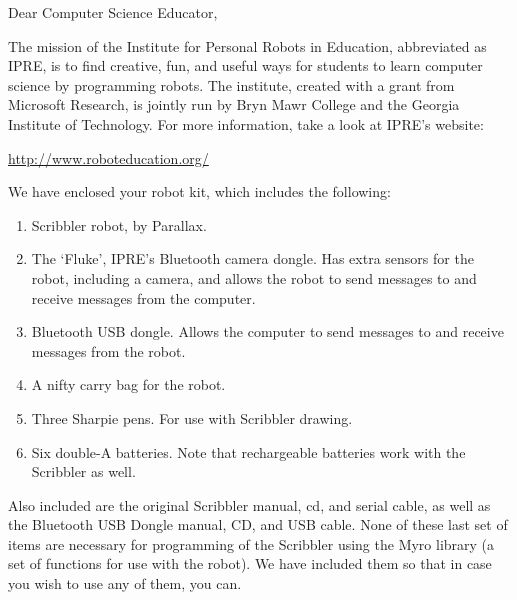 \documentclass{letter}[10pt]
\begin{document}
\signature{Institute for Personal Robots in Education}

\address{Institute for Personal Robots in Education\\
Park Science Bldg, Room 251\\
Bryn Mawr College\\
101 North Merion Ave\\
Bryn Mawr, PA 19010\\
Tel. (610) 526-5024}

\begin{letter}{}

\opening{Dear Computer Science Educator,}

The mission of the Institute for Personal Robots in Education,
abbreviated as IPRE, is to find creative, fun, and useful ways for
students to learn computer science by programming robots.  The
institute, created with a grant from Microsoft Research, is jointly
run by Bryn Mawr College and the Georgia Institute of Technology.  For
more information, take a look at IPRE's website:

\url{http://www.roboteducation.org/}

We have enclosed your robot kit, which includes the following:

\begin{enumerate}
\item Scribbler robot, by Parallax.

\item The `Fluke', IPRE's Bluetooth camera dongle.  Has extra sensors
for the robot, including a camera, and allows the robot to send
messages to and receive messages from the computer.
\item Bluetooth USB dongle.  Allows the computer to send messages to
and receive messages from the robot.
\item A nifty carry bag for the robot.
\item Three Sharpie pens.  For use with Scribbler drawing.
\item Six double-A batteries.  Note that rechargeable batteries work
with the Scribbler as well.
\end{enumerate}

Also included are the original Scribbler manual, cd, and serial cable,
as well as the Bluetooth USB Dongle manual, CD, and USB cable. None of
these last set of items are necessary for programming of the Scribbler
using the Myro library (a set of functions for use with the robot).
We have included them so that in case you wish to use any of them, you
can.


\end{letter}
\end{document}
